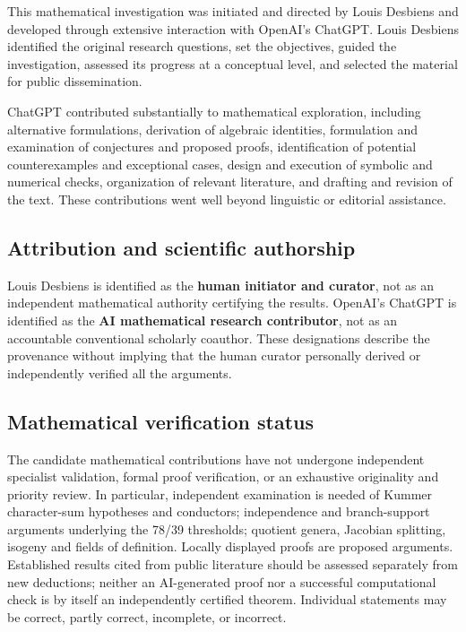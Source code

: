 \documentclass[
  11pt,
  a4paper,
]{article}
\begin{document}
This mathematical investigation was initiated and directed by Louis
Desbiens and developed through extensive interaction with OpenAI's
ChatGPT. Louis Desbiens identified the original research questions, set
the objectives, guided the investigation, assessed its progress at a
conceptual level, and selected the material for public dissemination.

ChatGPT contributed substantially to mathematical exploration, including
alternative formulations, derivation of algebraic identities,
formulation and examination of conjectures and proposed proofs,
identification of potential counterexamples and exceptional cases,
design and execution of symbolic and numerical checks, organization of
relevant literature, and drafting and revision of the text. These
contributions went well beyond linguistic or editorial assistance.

\subsection{Attribution and scientific
authorship}\label{attribution-and-scientific-authorship}

Louis Desbiens is identified as the \textbf{human initiator and
curator}, not as an independent mathematical authority certifying the
results. OpenAI's ChatGPT is identified as the \textbf{AI mathematical
research contributor}, not as an accountable conventional scholarly
coauthor. These designations describe the provenance without implying
that the human curator personally derived or independently verified all
the arguments.

\subsection{Mathematical verification
status}\label{mathematical-verification-status}

The candidate mathematical contributions have not undergone independent
specialist validation, formal proof verification, or an exhaustive
originality and priority review. In particular, independent examination
is needed of Kummer character-sum hypotheses and conductors;
independence and branch-support arguments underlying the 78/39
thresholds; quotient genera, Jacobian splitting, isogeny and fields of
definition. Locally displayed proofs are proposed arguments. Established
results cited from public literature should be assessed separately from
new deductions; neither an AI-generated proof nor a successful
computational check is by itself an independently certified theorem.
Individual statements may be correct, partly correct, incomplete, or
incorrect.
\end{document}
